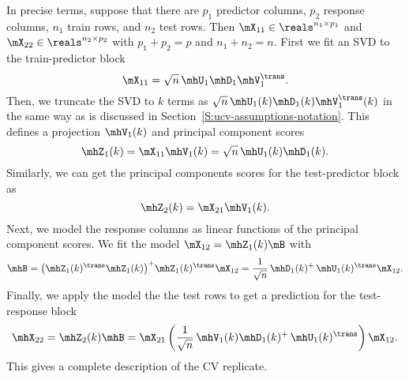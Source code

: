 In precise terms, suppose that there are $p_1$ predictor columns, $p_2$ response columns, $n_1$ train rows, and $n_2$ test rows.  Then $\mX_{11} \in \reals^{n_1 \times p_1}$ and $\mX_{22} \in \reals^{n_2 \times p_2}$ with
$p_1 + p_2 = p$ and $n_1 + n_2 = n$.  First we fit an SVD to the train-predictor block 
\[
    \mX_{11} = \sqrt{n} \, \mhU_1 \mhD_1 \mhV_1^\trans.  
\]    
Then, we truncate the SVD to $k$ terms as 
$\sqrt{n} \, \mhU_1(k) \mhD_1(k) \mhV_1^\trans(k)$ in the same way as is discussed 
in Section~\ref{S:ucv-assumptions-notation}.  This defines a projection 
$\mhV_1(k)$ and principal component scores 
\[
    \mhZ_1(k) = \mX_{11} \mhV_1(k) = \sqrt{n} \, \mhU_1(k) \mhD_1(k).
\]
Similarly, we can get the principal components scores for the test-predictor block as
\[
    \mhZ_2(k) = \mX_{21} \mhV_1(k).
\]
Next, we model the response columns as linear functions of the principal component scores.  We fit the model
\(
    \mX_{12} = \mhZ_1(k) \mB
\)
with
\[
    \mhB 
        =
        \big( \mhZ_1(k)^\trans \mhZ_1(k) \big)^{+} \mhZ_1(k)^\trans \mX_{12}
        =
        \frac{1}{\sqrt{n}} \,
        \mhD_1(k)^{+} \, \mhU_1(k)^\trans \mX_{12}.
\]
Finally, we apply the model the the test rows to get a prediction for the test-response block
\[
    \mhX_{22}
        =
        \mhZ_2(k) \mhB
        =
        \mX_{21} 
        \left(
            \frac{1}{\sqrt{n}} \,
            \mhV_1(k) \mhD_1(k)^{+} \, \mhU_1(k)^\trans 
        \right)
        \mX_{12}.
\]
This gives a complete description of the CV replicate.

